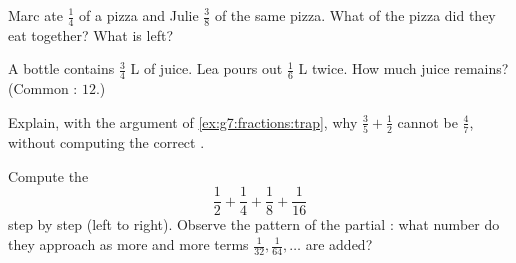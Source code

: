 \begin{exercise}[$\star\star$]\label{exo:g7:fractions:9}
Marc ate $\frac14$ of a pizza and Julie $\frac38$ of the same pizza.
What  of the pizza did they eat together? What  is
left?
\end{exercise}

\begin{exercise}[$\star\star$]\label{exo:g7:fractions:10}
A bottle contains $\frac34$ L of juice. Lea pours out $\frac16$ L
twice. How much juice remains? (Common : $12$.)
\end{exercise}

\begin{exercise}[$\star\star$]\label{exo:g7:fractions:11}
Explain, with the argument of \cref{ex:g7:fractions:trap}, why
$\frac35 + \frac12$ cannot be $\frac{4}{7}$, without computing the
correct .
\end{exercise}

\begin{exercise}[$\star\star\star$]\label{exo:g7:fractions:12}
Compute the 
\[
\frac12 + \frac14 + \frac18 + \frac{1}{16}
\]
step by step (left to right). Observe the pattern of the partial :
what number do they approach as more and more terms
$\frac{1}{32}, \frac{1}{64}, \dots$ are added?
\end{exercise}
